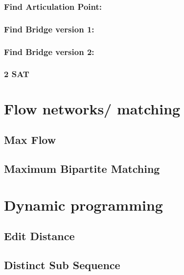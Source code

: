 \documentclass[11pt]{report}
\begin{document}
\subsection{Find Articulation Point:}

\subsection{Find Bridge version 1:}

\subsection{Find Bridge version 2:}

\subsection{2 SAT}


\chapter{Flow networks/ matching}
\section{Max Flow}

\section{Maximum Bipartite Matching}


\chapter{Dynamic programming}
\section{Edit Distance}

\section{Distinct Sub Sequence}

\end{document}
